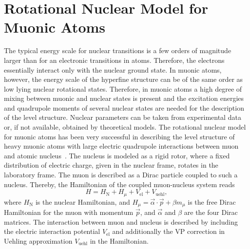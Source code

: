 \section{Rotational Nuclear Model for Muonic Atoms}
The typical energy scale for nuclear transitions is a few orders
of magnitude larger than for an electronic transitions
in atoms. Therefore, the electrons essentially interact only
with the nuclear ground state. In muonic atoms, however, the energy scale of the hyperfine structure can be of the same order as low lying nuclear rotational states.
Therefore, in muonic atoms a high degree of
mixing between muonic and nuclear states is present and the excitation energies and quadrupole moments of several nuclear states are needed for the description of the level structure. Nuclear parameters can be taken from experimental data or, if not available, obtained by theoretical models. The rotational nuclear model for muonic atoms has been very successful in describing the level structure of heavy muonic atoms with large electric quadrupole interactions between muon and atomic nucleus~\cite{tanaka1984,hitlin1970,wu1969,Devons1995}. The nucleus is modeled as a rigid rotor, where a fixed distribution of electric charge, given in the nuclear frame, rotates in the laboratory frame. The muon is described as a Dirac particle coupled to such a nucleus. Thereby, the Hamiltonian of the coupled muon-nucleus system reads
\begin{equation}
H = H_{\text{N}} + H_\mu + V_{\text{el}} + V_{\text{uehl}},
\label{eq:htot}
\end{equation}
where $H_{\text{N}}$ is the nuclear Hamiltonian, and ${H_\mu}{=}{\vec{\alpha} \cdot \vec{p} + \beta m_\mu}$ is the free Dirac Hamiltonian for the muon with momentum $\vec{p}$, and $\vec{\alpha}$ and $\beta$ are the four Dirac matrices. 
The interaction between muon and nucleus is described by including the electric interaction potential $V_{\text{el}}$ and additionally the VP correction in Uehling approximation $V_{\text{uehl}}$ in the Hamiltonian.

